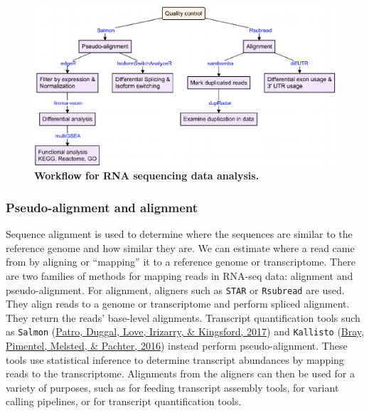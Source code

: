 \documentclass[12pt,twoside]{reedthesis}
\begin{document}
\begin{figure}[htbp]

{\centering \includegraphics{thesis_files/figure-latex/mf4-1} 

}

\caption[Workflow for RNA sequencing data analysis]{\textbf{Workflow for RNA sequencing data analysis.}}\label{fig:mf4}
\end{figure}
\hypertarget{m3.2.1}{%
\subsubsection*{Pseudo-alignment and alignment}\label{m3.2.1}}

Sequence alignment is used to determine where the sequences are similar
to the reference genome and how similar they are. We can estimate where
a read came from by aligning or ``mapping'' it to a reference genome or
transcriptome. There are two families of methods for mapping reads in
RNA-seq data: alignment and pseudo-alignment. For alignment, aligners
such as \texttt{STAR} or \texttt{Rsubread} are used. They align reads to a genome or
transcriptome and perform spliced alignment. They return the reads'
base-level alignments. Transcript quantification tools such as \texttt{Salmon}
(\protect\hyperlink{ref-patro2017}{Patro, Duggal, Love, Irizarry, \& Kingsford, 2017}) and \texttt{Kallisto} (\protect\hyperlink{ref-bray2016}{Bray, Pimentel, Melsted, \& Pachter, 2016}) instead perform
pseudo-alignment. These tools use statistical inference to determine
transcript abundances by mapping reads to the transcriptome. Alignments
from the aligners can then be used for a variety of purposes, such as
for feeding transcript assembly tools, for variant calling pipelines, or
for transcript quantification tools.
\end{document}
